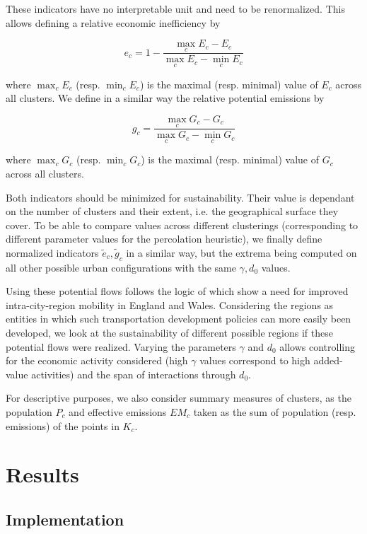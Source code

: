 \documentclass{jimis-en}
\begin{document}
These indicators have no interpretable unit and need to be renormalized. This allows defining a relative economic inefficiency by 

\begin{equation}
e_c = 1 - \frac{\max_c E_c - E_c}{\max_c E_c - \min_c E_c}
\end{equation}

where $\max_c E_c$ (resp. $\min_c E_c$) is the maximal (resp. minimal) value of $E_c$ across all clusters. We define in a similar way the relative potential emissions by

\begin{equation}
g_c = \frac{\max_c G_c - G_c}{\max_c G_c - \min_c G_c}
\end{equation}

where $\max_c G_c$ (resp. $\min_c G_c$) is the maximal (resp. minimal) value of $G_c$ across all clusters.

Both indicators should be minimized for sustainability. Their value is dependant on the number of clusters and their extent, i.e. the geographical surface they cover. To be able to compare values across different clusterings (corresponding to different parameter values for the percolation heuristic), we finally define normalized indicators $\tilde{e}_c,\tilde{g}_c$ in a similar way, but the extrema being computed on all other possible urban configurations with the same $\gamma,d_0$ values.

Using these potential flows follows the logic of \cite{arbabi2019development} which show a need for improved intra-city-region mobility in England and Wales. Considering the regions as entities in which such transportation development policies can more easily been developed, we look at the sustainability of different possible regions if these potential flows were realized. Varying the parameters $\gamma$ and $d_0$ allows controlling for the economic activity considered (high $\gamma$ values correspond to high added-value activities) and the span of interactions through $d_0$.

For descriptive purposes, we also consider summary measures of clusters, as the population $P_c$ and effective emissions $EM_c$ taken as the sum of population (resp. emissions) of the points in $K_c$.


\section{Results}

\subsection{Implementation}
\end{document}
